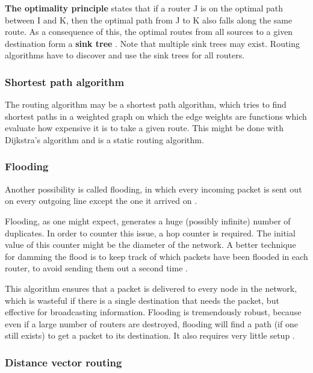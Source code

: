 \documentclass[12pt, oneside]{book}
\begin{document}
\textbf{The optimality principle} states that if a router J is on the optimal path between I and K, then the optimal path from J to K also falls along the same route. As a consequence of this, the optimal routes from all sources to a given destination form a \textbf{sink tree} \cite{dynamic-programming-bellman-2003}. Note that multiple sink trees may exist. Routing algorithms have to discover and use the sink trees for all routers.

\subsubsection{Shortest path algorithm}

The routing algorithm may be a shortest path algorithm, which tries to find shortest paths in a weighted graph on which the edge weights are functions which evaluate how expensive it is to take a given route.
This might be done with Dijkstra's algorithm and is a static routing algorithm.

\subsubsection{Flooding}

Another possibility is called flooding, in which every incoming packet is sent out on every outgoing line except the one it arrived on \cite[p.~368]{computer-networks-tanenbaum-2012}.

Flooding, as one might expect, generates a huge (possibly infinite) number of duplicates. In order to counter this issue, a hop counter is required. The initial value of this counter might be the diameter of the network. A better technique for damming the flood is to keep track of which packets have been flooded in each router, to avoid sending them out a second time \cite[p.~368]{computer-networks-tanenbaum-2012}.

This algorithm ensures that a packet is delivered to every node in the network, which is wasteful if there is a single destination that needs the packet, but effective for broadcasting information. Flooding is tremendously robust, because even if a large number of routers are destroyed, flooding will find a path (if one still exists) to get a packet to its destination. It also requires very little setup \cite[p.~370]{computer-networks-tanenbaum-2012}.

\subsubsection{Distance vector routing}
\end{document}
